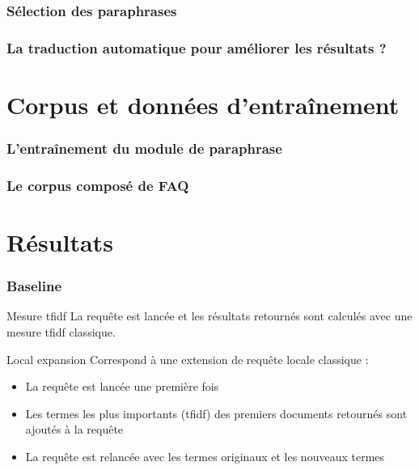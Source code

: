 \documentclass[10pt]{beamer}
\begin{document}
\begin{frame}
  \frametitle{Sélection des paraphrases}
\end{frame}

\begin{frame}
  \frametitle{La traduction automatique pour améliorer les résultats
    ?}
\end{frame}

\section{Corpus et données d'entraînement}
\label{sec:corpus}

\begin{frame}
  \frametitle{L'entraînement du module de paraphrase}
\end{frame}

\begin{frame}
  \frametitle{Le corpus composé de FAQ}
\end{frame}


\section{Résultats}
\label{sec:results}


\begin{frame}
  \frametitle{Baseline}

  \begin{block}{Mesure tfidf}
    La requête est lancée et les résultats retournés sont calculés
    avec une mesure tfidf classique.
  \end{block}
  \pause

  \begin{block}{Local expansion}
    Correspond à une extension de requête locale classique :

    \begin{itemize}
    \item La requête est lancée une première fois
    \item Les termes les plus importants (tfidf) des premiers
      documents retournés sont ajoutés à la requête
    \item La requête est relancée avec les termes originaux et les
      nouveaux termes
    \end{itemize}
  \end{block}
\end{frame}
\end{document}
